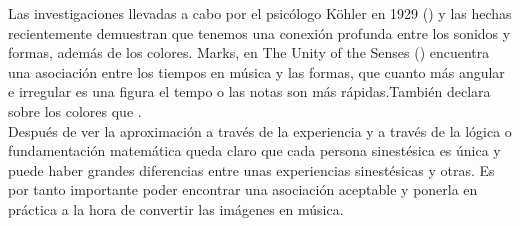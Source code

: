 Las investigaciones llevadas a cabo por el psicólogo Köhler en 1929 (\cite{GestaltPsychology}) y las hechas recientemente demuestran que tenemos una conexión profunda entre los sonidos y formas, además de los colores. Marks, en The Unity of the Senses (\cite{TheUnityOfTheSenses}) encuentra una asociación entre los tiempos en música y las formas, que cuanto más angular e irregular es una figura el tempo o las notas son más rápidas.También declara sobre los colores que .\\

Después de ver la aproximación a través de la experiencia y a través de la lógica o fundamentación matemática queda claro que cada persona sinestésica es única y puede haber grandes diferencias entre unas experiencias sinestésicas y otras. Es por tanto importante poder encontrar una asociación aceptable y ponerla en práctica a la hora de convertir las imágenes en música.
